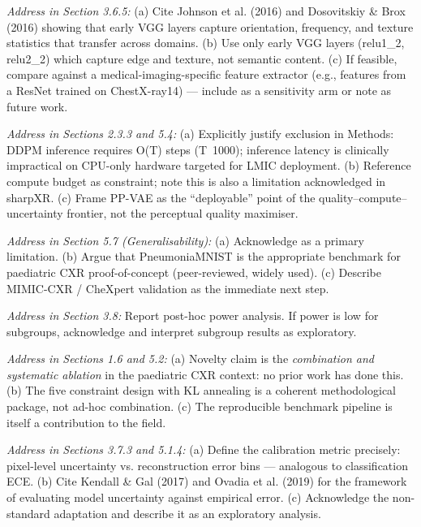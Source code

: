 \documentclass[12pt, a4paper]{article}
\begin{document}
\begin{description}[style=nextline, leftmargin=0pt]
\item[\color{critred}C5 — Perceptual loss domain mismatch]
\textit{Address in Section 3.6.5:}
(a) Cite Johnson et al. (2016) and Dosovitskiy \& Brox (2016)
showing that early VGG layers capture orientation, frequency, and
texture statistics that transfer across domains.
(b) Use only early VGG layers (relu1\_2, relu2\_2) which capture
edge and texture, not semantic content.
(c) If feasible, compare against a medical-imaging-specific feature
extractor (e.g., features from a ResNet trained on ChestX-ray14)
— include as a sensitivity arm or note as future work.

\item[\color{critred}C6 — No diffusion comparison]
\textit{Address in Sections 2.3.3 and 5.4:}
(a) Explicitly justify exclusion in Methods: DDPM inference
requires O(T) steps (T~1000); inference latency is clinically
impractical on CPU-only hardware targeted for LMIC deployment.
(b) Reference compute budget as constraint; note this is also
a limitation acknowledged in sharpXR.
(c) Frame PP-VAE as the ``deployable'' point of the
quality–compute–uncertainty frontier, not the perceptual quality
maximiser.

\item[\color{critred}C7 — Single-dataset evaluation]
\textit{Address in Section 5.7 (Generalisability):}
(a) Acknowledge as a primary limitation.
(b) Argue that PneumoniaMNIST is the appropriate benchmark
for paediatric CXR proof-of-concept (peer-reviewed, widely used).
(c) Describe MIMIC-CXR / CheXpert validation as the immediate
next step.

\item[\color{critred}C8 — Subgroup power]
\textit{Address in Section 3.8:}
Report post-hoc power analysis. If power is low for subgroups,
acknowledge and interpret subgroup results as exploratory.

\item[\color{critred}C9 — Incremental novelty]
\textit{Address in Sections 1.6 and 5.2:}
(a) Novelty claim is the \textit{combination and systematic ablation}
in the paediatric CXR context: no prior work has done this.
(b) The five constraint design with KL annealing is a coherent
methodological package, not ad-hoc combination.
(c) The reproducible benchmark pipeline is itself a contribution
to the field.

\item[\color{critred}C10 — Calibration metric non-standard]
\textit{Address in Sections 3.7.3 and 5.1.4:}
(a) Define the calibration metric precisely: pixel-level uncertainty
vs. reconstruction error bins — analogous to classification ECE.
(b) Cite Kendall \& Gal (2017) and Ovadia et al. (2019) for the
framework of evaluating model uncertainty against empirical error.
(c) Acknowledge the non-standard adaptation and describe it as
an exploratory analysis.


\end{description}
\end{document}
